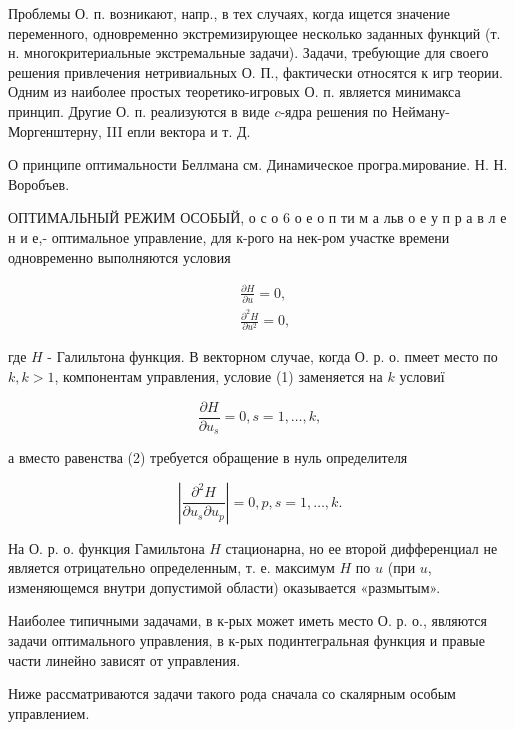 \documentclass[10pt]{article}
\begin{document}
Проблемы О. п. возникают, напр., в тех случаях, когда ищется значение переменного, одновременно экстремизирующее несколько заданных функций (т. н. многокритериальные экстремальные задачи). Задачи, требующие для своего решения привлечения нетривиальных О. П., фактически относятся к игр теории. Одним из наиболее простых теоретико-игровых О. п. является минимакса принцип. Другие О. п. реализуются в виде $c$-ядра решения по Нейману-Моргенштерну, III епли вектора и т. Д.



О принципе оптимальности Беллмана см. Динамическое програ.мирование. Н. Н. Воробъев.



ОПТИМАЛЬНЫЙ РЕЖИМ ОСОБЫЙ, о с о 6 о е о п ти м а льв о е у п р а в л е н и е,- оптимальное управление, для к-рого на нек-ром участке времени одновременно выполняются условия



\[

\begin{aligned}

& \frac{\partial H}{\partial u}=0, \\

& \frac{\partial^{2} H}{\partial u^{2}}=0,

\end{aligned}

\]



где $H$ - Галильтона функция. В векторном случае, когда О. р. о. пмеет место по $k, k>1$, компонентам управления, условие (1) заменяется на $k$ условиї



\[

\frac{\partial H}{\partial u_{s}}=0, s=1, \ldots, k,

\]



а вместо равенства (2) требуется обращение в нуль определителя



\[

\left|\frac{\partial^{2} H}{\partial u_{s} \partial u_{p}}\right|=0, p, s=1, \ldots, k .

\]



На О. р. о. функция Гамильтона $H$ стационарна, но ее второй дифференциал не является отрицательно определенным, т. е. максимум $H$ по $u$ (при $u$, изменяющемся внутри допустимой области) оказывается «размытым».



Наиболее типичными задачами, в к-рых может иметь место О. р. о., являются задачи оптимального управления, в к-рых подинтегральная функция и правые части линейно зависят от управления.



Ниже рассматриваются задачи такого рода сначала со скалярным особым управлением.
\end{document}
